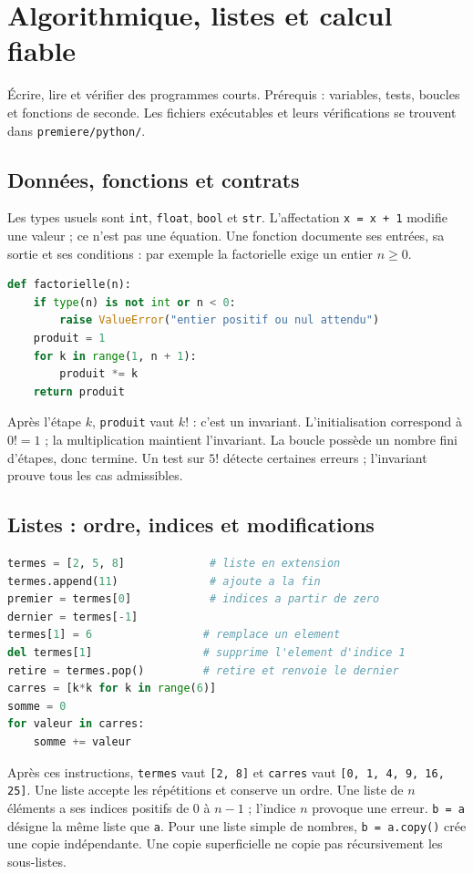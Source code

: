 \documentclass[../cours_1re.tex]{subfiles}
\begin{document}
\setcounter{chapter}{23}
\chapter{Algorithmique, listes et calcul fiable}
\label{ch:24}
\begin{objectif}
Écrire, lire et vérifier des programmes courts. Prérequis : variables, tests, boucles et fonctions de seconde.
Les fichiers exécutables et leurs vérifications se trouvent dans \texttt{premiere/python/}.
\end{objectif}
\section{Données, fonctions et contrats}
Les types usuels sont \texttt{int}, \texttt{float}, \texttt{bool} et \texttt{str}.
L'affectation \texttt{x = x + 1} modifie une valeur ; ce n'est pas une équation.
Une fonction documente ses entrées, sa sortie et ses conditions :
par exemple la factorielle exige un entier $n\ge0$.
\begin{lstlisting}[language=Python]
def factorielle(n):
    if type(n) is not int or n < 0:
        raise ValueError("entier positif ou nul attendu")
    produit = 1
    for k in range(1, n + 1):
        produit *= k
    return produit
\end{lstlisting}
Après l'étape $k$, \texttt{produit} vaut $k!$ : c'est un invariant.
L'initialisation correspond à $0!=1$ ; la multiplication maintient l'invariant.
La boucle possède un nombre fini d'étapes, donc termine.
Un test sur $5!$ détecte certaines erreurs ; l'invariant prouve tous les cas admissibles.

\section{Listes : ordre, indices et modifications}
\begin{lstlisting}[language=Python]
termes = [2, 5, 8]             # liste en extension
termes.append(11)              # ajoute a la fin
premier = termes[0]            # indices a partir de zero
dernier = termes[-1]
termes[1] = 6                 # remplace un element
del termes[1]                 # supprime l'element d'indice 1
retire = termes.pop()         # retire et renvoie le dernier
carres = [k*k for k in range(6)]
somme = 0
for valeur in carres:
    somme += valeur
\end{lstlisting}
Après ces instructions, \texttt{termes} vaut \texttt{[2, 8]} et
\texttt{carres} vaut \texttt{[0, 1, 4, 9, 16, 25]}. Une liste accepte
les répétitions et conserve un ordre. Une liste de $n$ éléments a ses indices
positifs de $0$ à $n-1$ ; l'indice $n$ provoque une erreur.
\texttt{b = a} désigne la même liste que \texttt{a}.
Pour une liste simple de nombres, \texttt{b = a.copy()} crée une copie indépendante.
Une copie superficielle ne copie pas récursivement les sous-listes.
\end{document}
